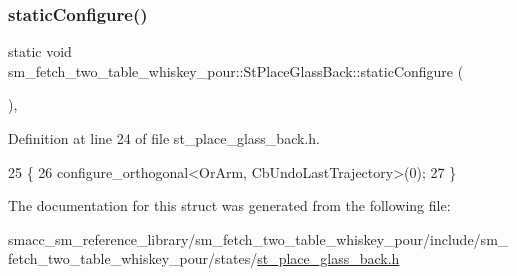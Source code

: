 \subsubsection{\texorpdfstring{static\+Configure()}{staticConfigure()}}
{\footnotesize\ttfamily static void sm\+\_\+fetch\+\_\+two\+\_\+table\+\_\+whiskey\+\_\+pour\+::\+St\+Place\+Glass\+Back\+::static\+Configure (\begin{DoxyParamCaption}{ }\end{DoxyParamCaption})\hspace{0.3cm}{\ttfamily [inline]}, {\ttfamily [static]}}



Definition at line 24 of file st\+\_\+place\+\_\+glass\+\_\+back.\+h.


\begin{DoxyCode}
25         \{
26             configure\_orthogonal<OrArm, CbUndoLastTrajectory>(0);
27         \}
\end{DoxyCode}


The documentation for this struct was generated from the following file\+:\begin{DoxyCompactItemize}
\item 
smacc\+\_\+sm\+\_\+reference\+\_\+library/sm\+\_\+fetch\+\_\+two\+\_\+table\+\_\+whiskey\+\_\+pour/include/sm\+\_\+fetch\+\_\+two\+\_\+table\+\_\+whiskey\+\_\+pour/states/\hyperlink{st__place__glass__back_8h}{st\+\_\+place\+\_\+glass\+\_\+back.\+h}\end{DoxyCompactItemize}
